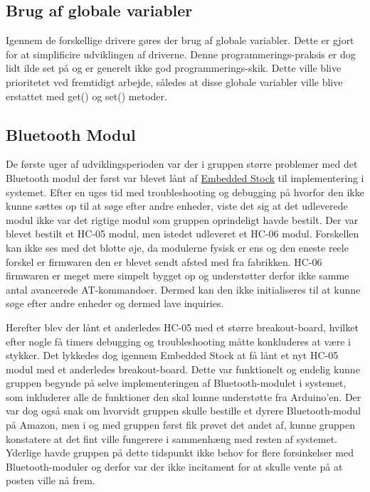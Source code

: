 \subsection{Brug af globale variabler}
Igennem de forskellige drivere gøres der brug af globale variabler. Dette er gjort for at simplificire udviklingen af driverne. Denne programmerings-praksis er dog lidt ilde set på og er generelt ikke god programmerings-skik. Dette ville blive prioritetet ved fremtidigt arbejde, således at disse globale variabler ville blive erstattet med get() og set() metoder. 

\subsection{Bluetooth Modul}
De første uger af udviklingsperioden var der i gruppen større problemer med det Bluetooth modul der først var blevet lånt af \href{https://stockmanager.ase.au.dk/}{Embedded Stock} til implementering i systemet. Efter en uges tid med troubleshooting og debugging på hvorfor den ikke kunne sættes op til at søge efter andre enheder, viste det sig at det udleverede modul ikke var det rigtige modul som gruppen oprindeligt havde bestilt. Der var blevet bestilt et HC-05 modul, men istedet udleveret et HC-06 modul. Forskellen kan ikke ses med det blotte øje, da modulerne fysisk er ens og den eneste reele forskel er firmwaren den er blevet sendt afsted med fra fabrikken. HC-06 firmwaren er meget mere simpelt bygget op og understøtter derfor ikke samme antal avancerede AT-kommandoer. Dermed kan den ikke initialiseres til at kunne søge efter andre enheder og dermed lave inquiries.

Herefter blev der lånt et anderledes HC-05 med et større breakout-board, hvilket efter nogle få timers debugging og troubleshooting måtte konkluderes at være i stykker. Det lykkedes dog igennem Embedded Stock at få lånt et nyt HC-05 modul med et anderledes breakout-board. Dette var funktionelt og endelig kunne gruppen begynde på selve implementeringen af Bluetooth-modulet i systemet, som inkluderer alle de funktioner den skal kunne understøtte fra Arduino'en. Der var dog også snak om hvorvidt gruppen skulle bestille et dyrere Bluetooth-modul på Amazon, men i og med gruppen først fik prøvet det andet af, kunne gruppen konstatere at det fint ville fungerere i sammenhæng med resten af systemet. Yderlige havde gruppen på dette tidspunkt ikke behov for flere forsinkelser med Bluetooth-moduler og derfor var der ikke incitament for at skulle vente på at posten ville nå frem.


